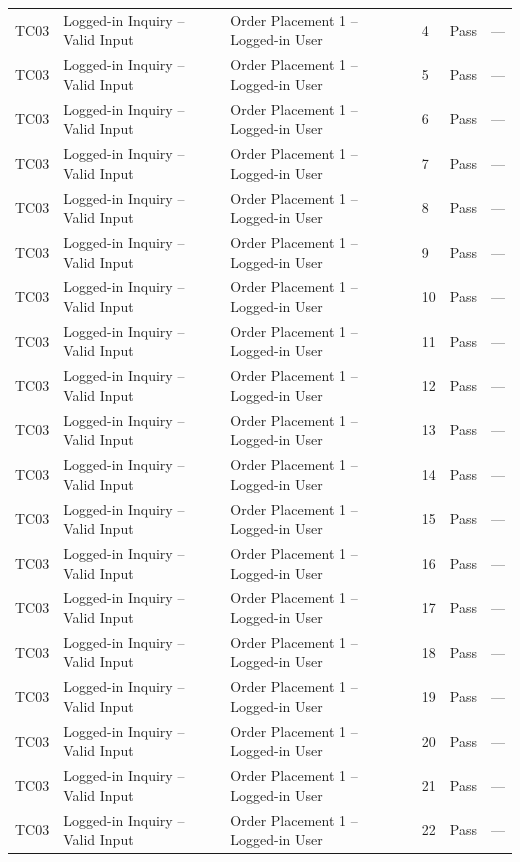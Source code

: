 {\begin{longtable}{@{}p{1.2cm} p{4.2cm} p{4.4cm} p{0.8cm} p{0.9cm} p{1.6cm}@{}}
  TC03 & Logged-in Inquiry -- Valid Input & Order Placement 1 -- Logged-in User & 4 & Pass & --- \\
  TC03 & Logged-in Inquiry -- Valid Input & Order Placement 1 -- Logged-in User & 5 & Pass & --- \\
  TC03 & Logged-in Inquiry -- Valid Input & Order Placement 1 -- Logged-in User & 6 & Pass & --- \\
  TC03 & Logged-in Inquiry -- Valid Input & Order Placement 1 -- Logged-in User & 7 & Pass & --- \\
  TC03 & Logged-in Inquiry -- Valid Input & Order Placement 1 -- Logged-in User & 8 & Pass & --- \\
  TC03 & Logged-in Inquiry -- Valid Input & Order Placement 1 -- Logged-in User & 9 & Pass & --- \\
  TC03 & Logged-in Inquiry -- Valid Input & Order Placement 1 -- Logged-in User & 10 & Pass & --- \\
  TC03 & Logged-in Inquiry -- Valid Input & Order Placement 1 -- Logged-in User & 11 & Pass & --- \\
  TC03 & Logged-in Inquiry -- Valid Input & Order Placement 1 -- Logged-in User & 12 & Pass & --- \\
  TC03 & Logged-in Inquiry -- Valid Input & Order Placement 1 -- Logged-in User & 13 & Pass & --- \\
  TC03 & Logged-in Inquiry -- Valid Input & Order Placement 1 -- Logged-in User & 14 & Pass & --- \\
  TC03 & Logged-in Inquiry -- Valid Input & Order Placement 1 -- Logged-in User & 15 & Pass & --- \\
  TC03 & Logged-in Inquiry -- Valid Input & Order Placement 1 -- Logged-in User & 16 & Pass & --- \\
  TC03 & Logged-in Inquiry -- Valid Input & Order Placement 1 -- Logged-in User & 17 & Pass & --- \\
  TC03 & Logged-in Inquiry -- Valid Input & Order Placement 1 -- Logged-in User & 18 & Pass & --- \\
  TC03 & Logged-in Inquiry -- Valid Input & Order Placement 1 -- Logged-in User & 19 & Pass & --- \\
  TC03 & Logged-in Inquiry -- Valid Input & Order Placement 1 -- Logged-in User & 20 & Pass & --- \\
  TC03 & Logged-in Inquiry -- Valid Input & Order Placement 1 -- Logged-in User & 21 & Pass & --- \\
  TC03 & Logged-in Inquiry -- Valid Input & Order Placement 1 -- Logged-in User & 22 & Pass & --- \\

\end{longtable}}
